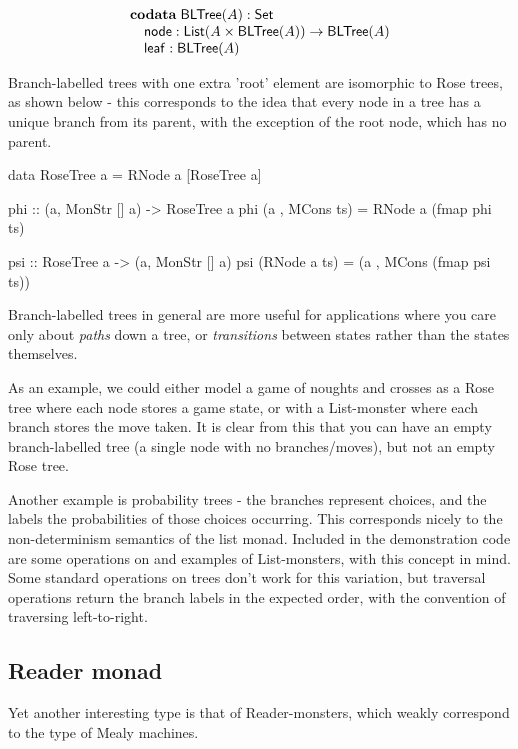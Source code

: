$$
\begin{array}[t]{l}
\mathbf{codata}\;
\mathsf{BLTree}(A):\mathsf{Set}\\
\quad \mathsf{node} : \mathsf{List}(A \times \mathsf{BLTree}(A)) \rightarrow \mathsf{BLTree}(A)\\
\quad \mathsf{leaf} : \mathsf{BLTree}(A)
\end{array}
$$

Branch-labelled trees with one extra 'root' element are isomorphic to Rose trees, as shown below - this corresponds to the idea that every node in a tree has a unique branch from its parent, with the exception of the root node, which has no parent.

\begin{haskell}
data RoseTree a = RNode a [RoseTree a]

phi :: (a, MonStr [] a) -> RoseTree a
phi (a , MCons ts) = RNode a (fmap phi ts)

psi :: RoseTree a -> (a, MonStr [] a)
psi (RNode a ts) = (a , MCons (fmap psi ts))
\end{haskell}

Branch-labelled trees in general are more useful for applications where you care only about \emph{paths} down a tree, or \emph{transitions} between states rather than the states themselves. 

As an example, we could either model a game of noughts and crosses as a Rose tree where each node stores a game state, or with a List-monster where each branch stores the move taken. It is clear from this that you can have an empty branch-labelled tree (a single node with no branches/moves), but not an empty Rose tree.

Another example is probability trees - the branches represent choices, and the labels the probabilities of those choices occurring. This corresponds nicely to the non-determinism semantics of the list monad. Included in the demonstration code are some operations on and examples of List-monsters, with this concept in mind. \\

Some standard operations on trees don't work for this variation, but traversal operations return the branch labels in the expected order, with the convention of traversing left-to-right. 

\subsection{Reader monad}

Yet another interesting type is that of Reader-monsters, which weakly correspond to the type of Mealy machines. 

